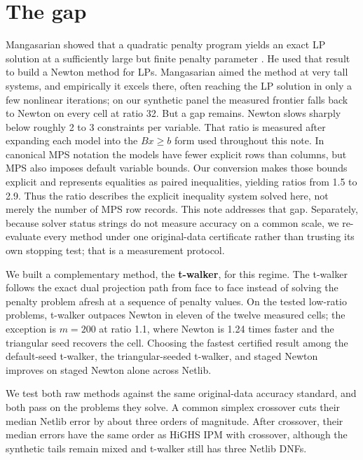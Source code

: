 \documentclass[11pt]{article}
\newcommand{\method}[1]{\textbf{#1}}
\begin{document}
\section{The gap}

Mangasarian showed that a quadratic penalty program yields an exact LP solution at a sufficiently large but finite penalty parameter \citep{mangasarian-meyer-1979,mangasarian-1984,mangasarian-2004}. He used that result to build a Newton method for LPs. Mangasarian aimed the method at very tall systems, and empirically it excels there, often reaching the LP solution in only a few nonlinear iterations; on our synthetic panel the measured frontier falls back to Newton on every cell at ratio 32. But a gap remains. Newton slows sharply below roughly 2 to 3 constraints per variable. That ratio is measured after expanding each model into the $Bx\ge b$ form used throughout this note. In canonical MPS notation the models have fewer explicit rows than columns, but MPS also imposes default variable bounds. Our conversion makes those bounds explicit and represents equalities as paired inequalities, yielding ratios from 1.5 to 2.9. Thus the ratio describes the explicit inequality system solved here, not merely the number of MPS row records. This note addresses that gap. Separately, because solver status strings do not measure accuracy on a common scale, we re-evaluate every method under one original-data certificate rather than trusting its own stopping test; that is a measurement protocol.

We built a complementary method, the \method{t-walker}, for this regime. The t-walker follows the exact dual projection path from face to face instead of solving the penalty problem afresh at a sequence of penalty values. On the tested low-ratio problems, t-walker outpaces Newton in eleven of the twelve measured cells; the exception is $m=200$ at ratio 1.1, where Newton is 1.24 times faster and the triangular seed recovers the cell. Choosing the fastest certified result among the default-seed t-walker, the triangular-seeded t-walker, and staged Newton improves on staged Newton alone across Netlib.

We test both raw methods against the same original-data accuracy standard, and both pass on the problems they solve. A common simplex crossover cuts their median Netlib error by about three orders of magnitude. After crossover, their median errors have the same order as HiGHS IPM with crossover, although the synthetic tails remain mixed and t-walker still has three Netlib DNFs.
\end{document}
